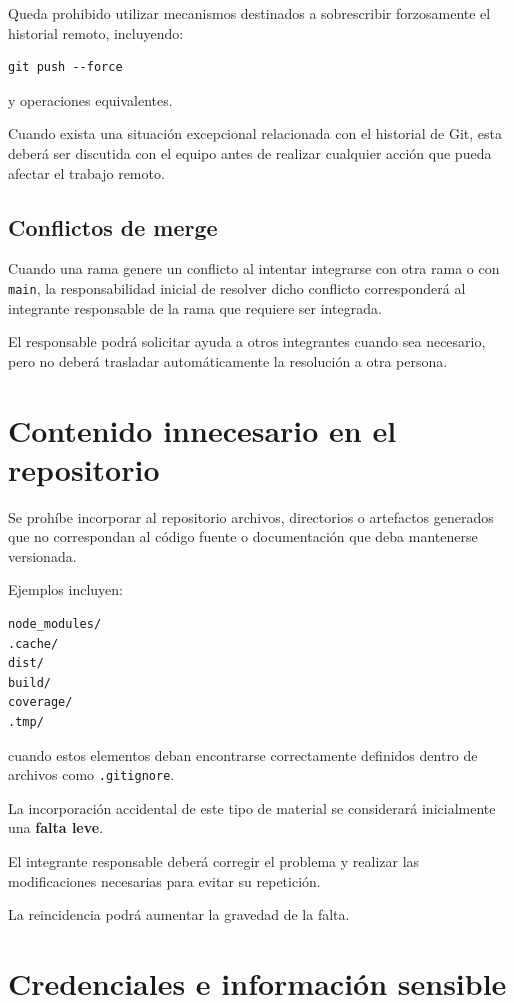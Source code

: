 \documentclass[12pt,a4paper]{article}
\begin{document}
Queda prohibido utilizar mecanismos destinados a sobrescribir forzosamente el historial remoto, incluyendo:

\begin{verbatim}
git push --force
\end{verbatim}

y operaciones equivalentes.

Cuando exista una situación excepcional relacionada con el historial de Git, esta deberá ser discutida con el equipo antes de realizar cualquier acción que pueda afectar el trabajo remoto.

\subsection{Conflictos de merge}

Cuando una rama genere un conflicto al intentar integrarse con otra rama o con \texttt{main}, la responsabilidad inicial de resolver dicho conflicto corresponderá al integrante responsable de la rama que requiere ser integrada.

El responsable podrá solicitar ayuda a otros integrantes cuando sea necesario, pero no deberá trasladar automáticamente la resolución a otra persona.

\section{Contenido innecesario en el repositorio}

Se prohíbe incorporar al repositorio archivos, directorios o artefactos generados que no correspondan al código fuente o documentación que deba mantenerse versionada.

Ejemplos incluyen:

\begin{verbatim}
node_modules/
.cache/
dist/
build/
coverage/
.tmp/
\end{verbatim}

cuando estos elementos deban encontrarse correctamente definidos dentro de archivos como \texttt{.gitignore}.

La incorporación accidental de este tipo de material se considerará inicialmente una \textbf{falta leve}.

El integrante responsable deberá corregir el problema y realizar las modificaciones necesarias para evitar su repetición.

La reincidencia podrá aumentar la gravedad de la falta.

\section{Credenciales e información sensible}
\end{document}
